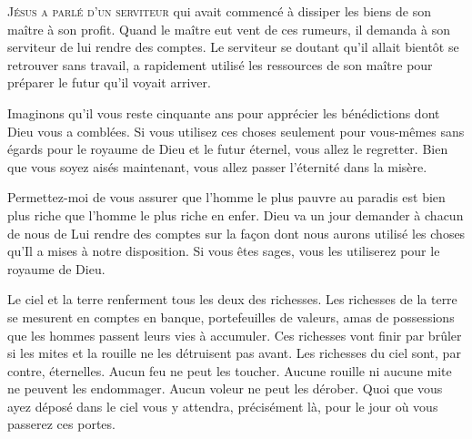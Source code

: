 \lettrine{J}{ésus a parlé d'un serviteur} qui avait commencé
 à dissiper les biens de son maître à son profit.
 Quand le maître eut vent de ces rumeurs, il demanda à son serviteur
 de lui rendre des comptes. Le serviteur se doutant qu'il allait bientôt
 se retrouver sans travail, a rapidement utilisé les ressources
 de son maître pour préparer le futur qu'il voyait arriver.

Imaginons qu'il vous reste cinquante ans pour apprécier les bénédictions
 dont Dieu vous a comblées. Si vous utilisez ces choses seulement
 pour vous-mêmes sans égards pour le royaume de Dieu et le futur éternel,
 vous allez le regretter. Bien que vous soyez aisés maintenant,
 vous allez passer l'éternité dans la misère.

Permettez-moi de vous assurer que l'homme le plus pauvre au paradis
 est bien plus riche que l'homme le plus riche en enfer.
 Dieu va un jour demander à chacun de nous de Lui rendre des comptes
 sur la façon dont nous aurons utilisé les choses qu'Il a mises
 à notre disposition. Si vous êtes sages,
 vous les utiliserez pour le royaume de Dieu.

Le ciel et la terre renferment tous les deux des richesses.
 Les richesses de la terre se mesurent en comptes en banque,
 portefeuilles de valeurs, amas de possessions que les hommes passent
 leurs vies à accumuler. Ces richesses vont finir par brûler si les mites
 et la rouille ne les détruisent pas avant. Les richesses du ciel sont,
 par contre, éternelles. Aucun feu ne peut les toucher.
 Aucune rouille ni aucune mite ne peuvent les endommager.
 Aucun voleur ne peut les dérober. Quoi que vous ayez déposé dans le ciel
 vous y attendra, précisément là, pour le jour où vous passerez ces portes.


\dvrule






